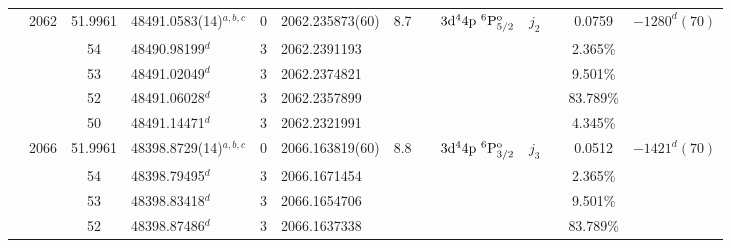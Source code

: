 \begin{table*}
\begin{center}
{\begin{tabular}{:l;l;c;l;c;l;c;l;l;c;c;c;c}
                                  & 2062   & 51.9961   & 48491.0583(14)$^{a,b,c}$         & 0 &   2062.235873(60)  &  8.7 & $                                        $ & $3\rm{d}^44\rm{p}~^6\rm{P}_{5/2}^{\rm o} $ & $j_{2} $ &              & 0.0759    & $-1280^{d}(70) $\\
\rowstyle{\itshape}               &        & 54        & 48490.98199$^{d}$                & 3 &  2062.2391193      &      & $                                        $ & $                                        $ & $      $ &              & 2.365\%   & $     ^{}     $\\
\rowstyle{\itshape}               &        & 53        & 48491.02049$^{d}$                & 3 &  2062.2374821      &      & $                                        $ & $                                        $ & $      $ &              & 9.501\%   & $     ^{}     $\\
\rowstyle{\itshape}               &        & 52        & 48491.06028$^{d}$                & 3 &  2062.2357899      &      & $                                        $ & $                                        $ & $      $ &              & 83.789\%  & $     ^{}     $\\
\rowstyle{\itshape}               &        & 50        & 48491.14471$^{d}$                & 3 &  2062.2321991      &      & $                                        $ & $                                        $ & $      $ &              & 4.345\%   & $     ^{}     $\\
                                  & 2066   & 51.9961   & 48398.8729(14)$^{a,b,c}$         & 0 &   2066.163819(60)  &  8.8 & $                                        $ & $3\rm{d}^44\rm{p}~^6\rm{P}_{3/2}^{\rm o} $ & $j_{3} $ &              & 0.0512    & $-1421^{d}(70) $\\
\rowstyle{\itshape}               &        & 54        & 48398.79495$^{d}$                & 3 &  2066.1671454      &      & $                                        $ & $                                        $ & $      $ &              & 2.365\%   & $     ^{}     $\\
\rowstyle{\itshape}               &        & 53        & 48398.83418$^{d}$                & 3 &  2066.1654706      &      & $                                        $ & $                                        $ & $      $ &              & 9.501\%   & $     ^{}     $\\
\rowstyle{\itshape}               &        & 52        & 48398.87486$^{d}$                & 3 &  2066.1637338      &      & $                                        $ & $                                        $ & $      $ &              & 83.789\%  & $     ^{}     $\\

\end{tabular}}
\end{center}
\end{table*}
